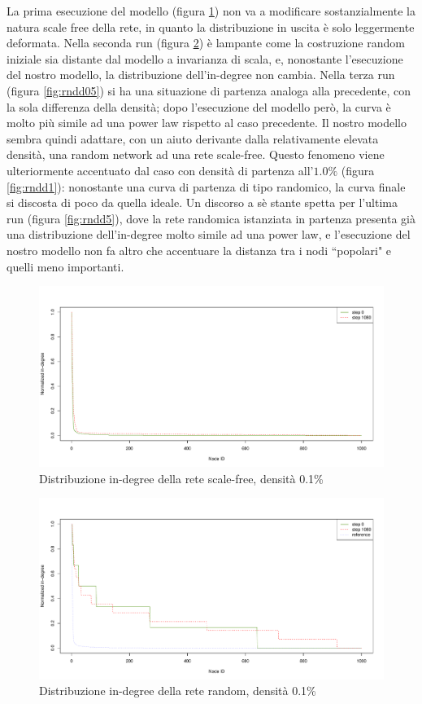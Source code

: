 \documentclass[a4paper,12pt]{article}
\begin{document}
La prima esecuzione del modello (figura \ref{fig:sfd}) non va a modificare sostanzialmente la natura scale free della rete, in quanto la distribuzione in uscita è solo leggermente deformata. Nella seconda run (figura \ref{fig:rndd01}) è lampante come la costruzione random iniziale sia distante dal modello a invarianza di scala, e, nonostante l'esecuzione del nostro modello, la distribuzione dell'in-degree non cambia. Nella terza run (figura \ref{fig:rndd05}) si ha una situazione di partenza analoga alla precedente, con la sola differenza della densità; dopo l'esecuzione del modello però, la curva è molto più simile ad una power law rispetto al caso precedente. Il nostro modello sembra quindi adattare, con un aiuto derivante dalla relativamente elevata densità, una random network ad una rete scale-free. Questo fenomeno viene ulteriormente accentuato dal caso con densità di partenza all'$1.0\%$ (figura \ref{fig:rndd1}): nonostante una curva di partenza di tipo randomico, la curva finale si discosta di poco da quella ideale. Un discorso a sè stante spetta per l'ultima run (figura \ref{fig:rndd5}), dove la rete randomica istanziata in partenza presenta già una distribuzione dell'in-degree molto simile ad una power law, e l'esecuzione del nostro modello non fa altro che accentuare la distanza tra i nodi ``popolari" e quelli meno importanti.
\begin{figure}[H]
\centering
\includegraphics[scale=0.5]{images/dist_1000_sf_1080_0.pdf}
\caption{Distribuzione in-degree della rete scale-free, densità 0.1\%}
\label{fig:sfd}
\end{figure}
\begin{figure}[H]
\centering
\includegraphics[scale=0.5]{images/dist_1000_rnd_1080_01_0.pdf}
\caption{Distribuzione in-degree della rete random, densità 0.1\%}
\label{fig:rndd01}
\end{figure}
\end{document}
